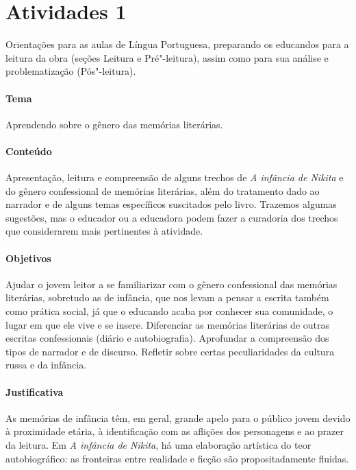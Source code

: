 \documentclass[11pt]{extarticle}
\begin{document}
\tableofcontents

\section{Atividades 1}



Orientações para as aulas de Língua Portuguesa, preparando os
educandos para a leitura da obra (seções Leitura e Pré"-leitura), assim como para
sua análise e problematização (Pós"-leitura).

\paragraph{Tema} Aprendendo sobre o gênero das memórias literárias.

\paragraph{Conteúdo}
Apresentação, leitura e compreensão de alguns trechos de \emph{A
infância de Nikita} e do gênero confessional de memórias literárias,
além do tratamento dado ao narrador e de alguns temas específicos
suscitados pelo livro. Trazemos algumas sugestões, mas o educador ou a
educadora podem fazer a curadoria dos trechos que considerarem mais
pertinentes à atividade.

\paragraph{Objetivos}
Ajudar o jovem leitor a se familiarizar com o gênero confessional das
memórias literárias, sobretudo as de infância, que nos levam a pensar a
escrita também como prática social, já que o educando acaba por conhecer
sua comunidade, o lugar em que ele vive e se insere. Diferenciar as
memórias literárias de outras escritas confessionais (diário e
autobiografia). Aprofundar a compreensão dos tipos de narrador e de
discurso. Refletir sobre certas peculiaridades da cultura russa e da
infância.

\paragraph{Justificativa}
As memórias de infância têm, em geral, grande apelo para o público jovem
devido à proximidade etária, à identificação com as aflições dos
personagens e ao prazer da leitura. Em \emph{A infância de Nikita}, há
uma elaboração artística do teor autobiográfico: as fronteiras entre
realidade e ficção são propositadamente fluidas.
\end{document}
